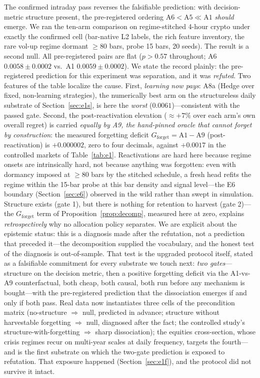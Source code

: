 \documentclass{article}
\newcommand{\Gforget}{G_{\mathrm{forget}}}
\begin{document}
The confirmed intraday pass reverses the falsifiable prediction: with
decision-metric structure present, the pre-registered ordering
$\text{A6} < \text{A5} \ll \text{A1}$ \emph{should} emerge. We ran the
ten-arm comparison on regime-stitched 4-hour crypto under exactly the
confirmed cell (bar-native L2 labels, the rich feature inventory, the
rare vol-up regime dormant $\ge 80$ bars, probe 15 bars, 20 seeds). The
result is a second null. All pre-registered pairs are flat
($p > 0.57$ throughout; A6 $0.0058 \pm 0.0002$ vs.\ A1
$0.0059 \pm 0.0002$). We state the record plainly: the pre-registered
prediction for this experiment was separation, and it was \emph{refuted}.
Two features of the table localize the cause.
First, \emph{learning now pays}: A8a (Hedge over fixed, non-learning
strategies), the numerically best arm on the structureless daily
substrate of Section~\ref{sec:e1s}, is here the \emph{worst}
($0.0061$)---consistent with the passed gate. Second, the
post-reactivation elevation ($\approx{+}7\%$ over each arm's own overall
regret) is carried \emph{equally by A9, the hand-pinned oracle that
cannot forget by construction}: the measured forgetting deficit
$\Gforget = \text{A1} - \text{A9}$ (post-reactivation) is $+0.000002$,
zero to four decimals, against $+0.0017$ in the controlled markets of
Table~\ref{tab:e1}. Reactivations are hard here because regime onsets
are intrinsically hard, not because anything was forgotten: even with
dormancy imposed at $\ge 80$ bars by the stitched schedule, a fresh
head refits the regime within the 15-bar probe at this bar density and
signal level---the E6 boundary (Section~\ref{sec:e6}) observed in the
wild rather than swept in simulation. Structure exists
(gate 1), but there is nothing for retention to harvest (gate 2)---the
$\Gforget$ term of Proposition~\ref{prop:decomp}, measured here at
zero, explains \emph{retrospectively} why no allocation policy
separates. We are explicit about the epistemic status: this is a
diagnosis made after the refutation, not a prediction that preceded
it---the decomposition supplied the vocabulary, and the honest test of
the diagnosis is out-of-sample. That test is the upgraded protocol
itself, stated as a falsifiable commitment for every substrate we touch
next: \emph{two gates}---structure on the decision metric, then a
positive forgetting deficit via the A1-vs-A9 counterfactual, both
cheap, both causal, both run before any mechanism is bought---with the
pre-registered prediction that the dissociation emerges if and only if
both pass. Real data now instantiates three cells of the
precondition matrix (no-structure $\Rightarrow$ null, predicted in
advance; structure without harvestable forgetting $\Rightarrow$ null,
diagnosed after the fact; the controlled study's
structure-with-forgetting $\Rightarrow$ sharp dissociation); the
equities cross-section, whose crisis regimes recur on multi-year scales
at daily frequency, targets the fourth---and is the first substrate on
which the two-gate prediction is exposed to refutation. That exposure
happened (Section~\ref{sec:e1f}), and the protocol did not survive it
intact.
\end{document}
